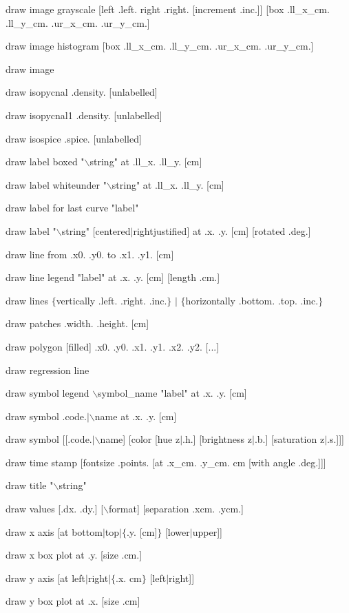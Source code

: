 draw image grayscale [left .left. right .right. [increment .inc.]] [box .ll\_x\_cm. .ll\_y\_cm. .ur\_x\_cm. .ur\_y\_cm.]

draw image histogram [box .ll\_x\_cm. .ll\_y\_cm. .ur\_x\_cm. .ur\_y\_cm.]

draw image

draw isopycnal .density. [unlabelled]

draw isopycnal1 .density. [unlabelled]

draw isospice .spice. [unlabelled]

draw label boxed "$\backslash$string" at .ll\_x. .ll\_y. [cm]

draw label whiteunder "$\backslash$string" at .ll\_x. .ll\_y. [cm]

draw label for last curve "label"

draw label "$\backslash$string" [centered$\mid$rightjustified] at .x. .y. [cm] [rotated .deg.]

draw line from .x0. .y0. to .x1. .y1. [cm]

draw line legend "label" at .x. .y. [cm] [length .cm.]

draw lines $\lbrace$vertically .left. .right. .inc.$\rbrace$ $\mid$ $\lbrace$horizontally .bottom. .top. .inc.$\rbrace$

draw patches .width. .height. [cm]

draw polygon [filled] .x0. .y0. .x1. .y1. .x2. .y2. [...]

draw regression line

draw symbol legend $\backslash$symbol\_name "label" at .x. .y. [cm]

draw symbol .code.$\mid$$\backslash$name at .x. .y. [cm]

draw symbol [[.code.$\mid$$\backslash$name] [color [hue z$\mid$.h.] [brightness z$\mid$.b.] [saturation z$\mid$.s.]]]

draw time stamp [fontsize .points. [at .x\_cm. .y\_cm. cm [with angle .deg.]]]

draw title "$\backslash$string"

draw values [.dx. .dy.] [$\backslash$format] [separation .xcm. .ycm.]

draw x axis [at bottom$\mid$top$\mid$$\lbrace$.y. [cm]$\rbrace$ [lower$\mid$upper]]

draw x box plot at .y. [size .cm.]

draw y axis [at left$\mid$right$\mid$$\lbrace$.x. cm$\rbrace$ [left$\mid$right]]

draw y box plot at .x. [size .cm]

